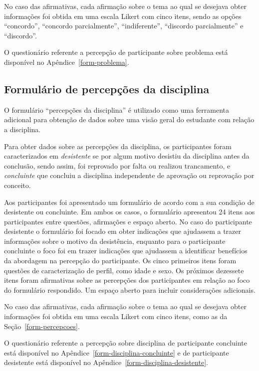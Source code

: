 No caso das afirmativas, cada afirmação sobre o tema ao qual se desejava obter informações
foi obtida em uma escala Likert com cinco itens,
sendo as opções ``concordo'', ``concordo parcialmente'', ``indiferente'',
``discordo parcialmente'' e ``discordo''.

O questionário referente a percepção de participante sobre problema está disponível no
Apêndice~\ref{form-problema}.

\subsection{Formulário de percepções da disciplina}
\label{form-disciplinas}
O formulário ``percepções da disciplina'' é utilizado como uma ferramenta adicional para obtenção de dados sobre uma visão geral do estudante com relação a disciplina.

Para obter dados sobre as percepções da disciplina, os participantes foram caracterizados em \textit{desistente}
se por algum motivo desistiu da disciplina antes da conclusão, sendo assim, foi reprovado por
falta ou realizou trancamento, e \textit{concluinte} que concluiu a disciplina independente
de aprovação ou reprovação por conceito.

Aos participantes foi apresentado um formulário de acordo com a sua condição de desistente
ou concluinte.
Em ambos os casos, o formulário apresentou 24 itens aos participantes entre questões,
afirmações e espaço aberto.
No caso do participante desistente o formulário foi focado em obter indicações
que ajudassem a trazer informações sobre o motivo da desistência, enquanto para o participante concluinte
o foco foi em trazer indicações que ajudassem a identificar benefícios da abordagem na percepção
do participante.
Os cinco primeiros itens foram questões de caracterização de perfil, como
idade e sexo.
Os próximos dezessete itens foram afirmativas sobre as percepções dos participantes em
relação ao foco do formulário respondido.
Um espaço aberto para incluir considerações adicionais.

No caso das afirmativas, cada afirmação sobre o tema ao qual se desejava obter informações
foi obtida em uma escala Likert com cinco itens, como as da Seção~\ref{form-percepcoes}.

O questionário referente a percepção sobre disciplina de participante
concluinte está disponível no Apêndice~\ref{form-disciplina-concluinte}
e de participante desistente está disponível no
Apêndice~\ref{form-disciplina-desistente}.
